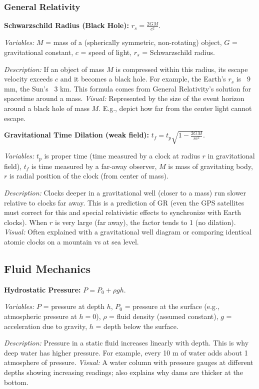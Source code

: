 \documentclass{article}
\begin{document}
\subsubsection*{General Relativity}

\textbf{Schwarzschild Radius (Black Hole):} $r_s = \frac{2 G M}{c^2}$.

\textit{Variables:} $M$ = mass of a (spherically symmetric, non-rotating) object, $G$ = gravitational constant, $c$ = speed of light, $r_s$ = Schwarzschild radius.

\textit{Description:} If an object of mass $M$ is compressed within this radius, its escape velocity exceeds $c$ and it becomes a black hole. For example, the Earth’s $r_s$ is ~9 mm, the Sun’s ~3 km. This formula comes from General Relativity’s solution for spacetime around a mass. \textit{Visual:} Represented by the size of the event horizon around a black hole of mass $M$. E.g., depict how far from the center light cannot escape.

\textbf{Gravitational Time Dilation (weak field):} $t_f = t_p \sqrt{1 - \frac{2GM}{r c^2}}$.

\textit{Variables:} $t_p$ is proper time (time measured by a clock at radius $r$ in gravitational field), $t_f$ is time measured by a far-away observer, $M$ is mass of gravitating body, $r$ is radial position of the clock (from center of mass).

\textit{Description:} Clocks deeper in a gravitational well (closer to a mass) run slower relative to clocks far away. This is a prediction of GR (even the GPS satellites must correct for this and special relativistic effects to synchronize with Earth clocks). When $r$ is very large (far away), the factor tends to 1 (no dilation). \textit{Visual:} Often explained with a gravitational well diagram or comparing identical atomic clocks on a mountain vs at sea level.

\subsection*{Fluid Mechanics}

\textbf{Hydrostatic Pressure:} $P = P_0 + \rho g h$.

\textit{Variables:} $P$ = pressure at depth $h$, $P_0$ = pressure at the surface (e.g., atmospheric pressure at $h=0$), $\rho$ = fluid density (assumed constant), $g$ = acceleration due to gravity, $h$ = depth below the surface.

\textit{Description:} Pressure in a static fluid increases linearly with depth. This is why deep water has higher pressure. For example, every 10 m of water adds about 1 atmosphere of pressure. \textit{Visual:} A water column with pressure gauges at different depths showing increasing readings; also explains why dams are thicker at the bottom.
\end{document}
